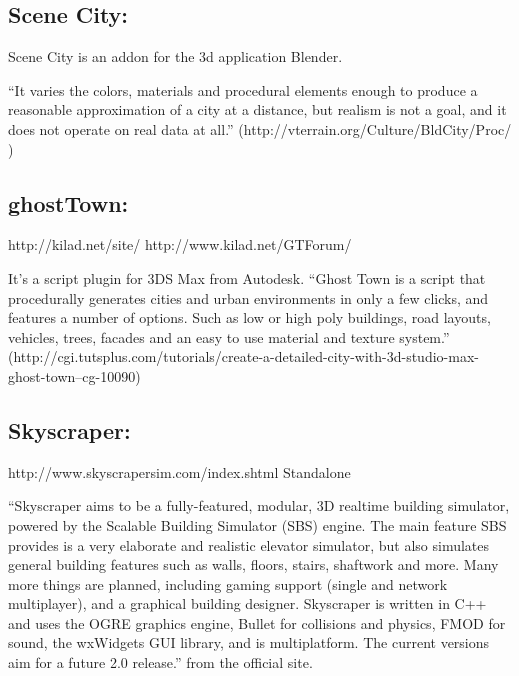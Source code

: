 \subsection{Scene City:} %
\label{sub:Scene City}

\cite{SceneCity2014}


Scene City is an addon for the 3d application Blender.


“It varies the colors, materials and procedural elements enough to produce a reasonable approximation of a city at a distance, but realism is not a goal, and it does not operate on real data at all.” (http://vterrain.org/Culture/BldCity/Proc/ )


\subsection{ghostTown:} %
\label{sub:ghosttown}

http://kilad.net/site/
http://www.kilad.net/GTForum/


It’s a script plugin for 3DS Max from Autodesk.
“Ghost Town is a script that procedurally generates cities and urban environments in only a few clicks, and features a number of options. Such as low or high poly buildings, road layouts, vehicles, trees, facades and an easy to use material and texture system.” (http://cgi.tutsplus.com/tutorials/create-a-detailed-city-with-3d-studio-max-ghost-town--cg-10090)


\subsection{Skyscraper:} %
\label{sub:skyscraper}

http://www.skyscrapersim.com/index.shtml
Standalone


“Skyscraper aims to be a fully-featured, modular, 3D realtime building simulator, powered by the Scalable Building Simulator (SBS) engine. The main feature SBS provides is a very elaborate and realistic elevator simulator, but also simulates general building features such as walls, floors, stairs, shaftwork and more. Many more things are planned, including gaming support (single and network multiplayer), and a graphical building designer. Skyscraper is written in C++ and uses the OGRE graphics engine, Bullet for collisions and physics, FMOD for sound, the wxWidgets GUI library, and is multiplatform. The current versions aim for a future 2.0 release.” from the official site.

